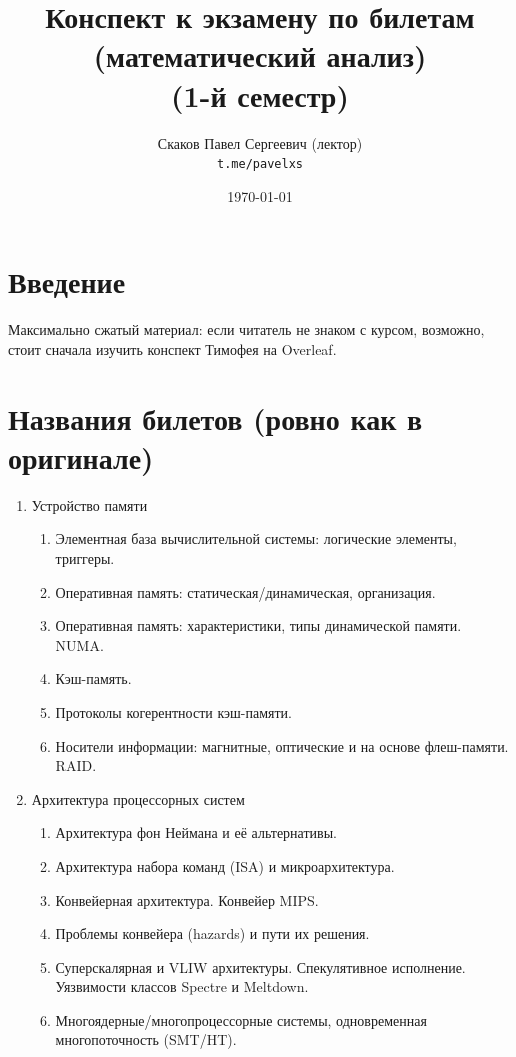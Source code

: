 \documentclass[12pt, a4paper]{article}
\title{Конспект к экзамену по билетам (математический анализ) \\(1-й семестр)}
\author{
  \vova
  \and
  Скаков Павел Сергеевич (лектор)\\
  \texttt{t.me/pavelxs}
}
\date{\today}
\begin{document}
\maketitle
\newpage
\tableofcontents
\newpage


\section{Введение}

Максимально сжатый материал: если читатель не знаком с курсом, возможно, 
стоит сначала изучить конспект Тимофея на Overleaf.


\section{Названия билетов (ровно как в оригинале)}

\begin{enumerate}
    \item Устройство памяти
    \begin{enumerate}
        \item Элементная база вычислительной системы: логические элементы, триггеры.
        \item Оперативная память: статическая/динамическая, организация.
        \item Оперативная память: характеристики, типы динамической памяти. NUMA.
        \item Кэш-память.
        \item Протоколы когерентности кэш-памяти.
        \item Носители информации: магнитные, оптические и на основе флеш-памяти. RAID.
    \end{enumerate}
    
    
    \item Архитектура процессорных систем
    \begin{enumerate}
        \item Архитектура фон Неймана и её альтернативы.
        \item Архитектура набора команд (ISA) и микроархитектура.
        \item Конвейерная архитектура. Конвейер MIPS.
        \item Проблемы конвейера (hazards) и пути их решения.
        \item Суперскалярная и VLIW архитектуры. Спекулятивное исполнение. Уязвимости классов Spectre и Meltdown.
        \item Многоядерные/многопроцессорные системы, одновременная многопоточность (SMT/HT).
    \end{enumerate}
\end{enumerate}
\end{document}
